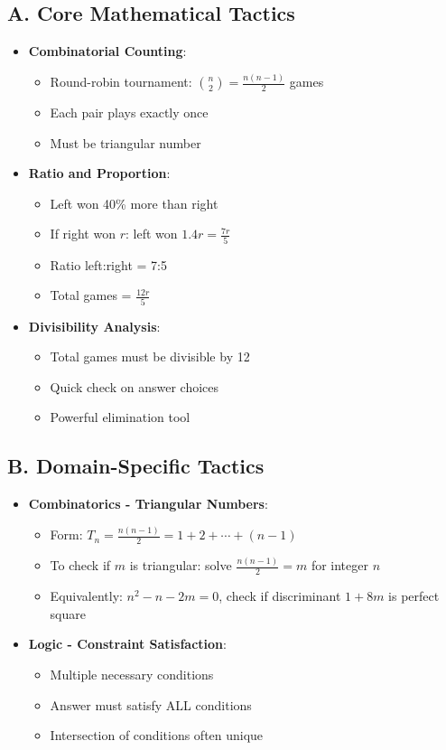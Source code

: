 \documentclass[12pt]{article}
\begin{document}
\begin{tacticalbox}
\subsection*{A. Core Mathematical Tactics}
\begin{itemize}[leftmargin=*]
    \item \textbf{Combinatorial Counting}: 
    \begin{itemize}
        \item Round-robin tournament: $\binom{n}{2} = \frac{n(n-1)}{2}$ games
        \item Each pair plays exactly once
        \item Must be triangular number
    \end{itemize}
    \item \textbf{Ratio and Proportion}: 
    \begin{itemize}
        \item Left won 40\% more than right
        \item If right won $r$: left won $1.4r = \frac{7r}{5}$
        \item Ratio left:right = 7:5
        \item Total games = $\frac{12r}{5}$
    \end{itemize}
    \item \textbf{Divisibility Analysis}: 
    \begin{itemize}
        \item Total games must be divisible by 12
        \item Quick check on answer choices
        \item Powerful elimination tool
    \end{itemize}
\end{itemize}

\subsection*{B. Domain-Specific Tactics}
\begin{itemize}[leftmargin=*]
    \item \textbf{Combinatorics - Triangular Numbers}:
    \begin{itemize}
        \item Form: $T_n = \frac{n(n-1)}{2} = 1+2+\cdots+(n-1)$
        \item To check if $m$ is triangular: solve $\frac{n(n-1)}{2} = m$ for integer $n$
        \item Equivalently: $n^2 - n - 2m = 0$, check if discriminant $1+8m$ is perfect square
    \end{itemize}
    \item \textbf{Logic - Constraint Satisfaction}:
    \begin{itemize}
        \item Multiple necessary conditions
        \item Answer must satisfy ALL conditions
        \item Intersection of conditions often unique
    \end{itemize}
\end{itemize}


\end{tacticalbox}
\end{document}
